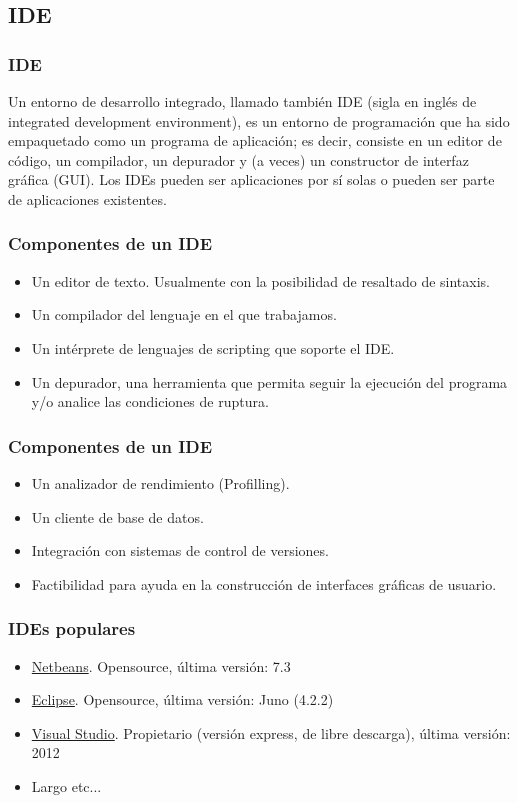 \documentclass[12pt]{beamer}
\begin{document}
\subsection{IDE}

\begin{frame}
 \frametitle{IDE}
 Un entorno de desarrollo integrado, llamado también IDE (sigla en inglés de integrated development environment), es un entorno de programación que ha sido empaquetado como un programa de aplicación; es decir, consiste en un editor de código, un compilador, un depurador y (a veces) un constructor de interfaz gráfica (GUI). Los IDEs pueden ser aplicaciones por sí solas o pueden ser parte de aplicaciones existentes. 
\end{frame}


\begin{frame}
 \frametitle{Componentes de un IDE}
 \begin{itemize}
  \item<2-> Un editor de texto. Usualmente con la posibilidad de resaltado de sintaxis.
  \item<3-> Un compilador del lenguaje en el que trabajamos.
  \item<4-> Un intérprete de lenguajes de scripting que soporte el IDE.
  \item<5-> Un depurador, una herramienta que permita seguir la ejecución del programa y/o analice las condiciones de ruptura.
  \end{itemize}
\end{frame}


\begin{frame}
 \frametitle{Componentes de un IDE}
 \begin{itemize}
  \item<2-> Un analizador de rendimiento (Profilling).
  \item<3-> Un cliente de base de datos.
  \item<4-> Integración con sistemas de control de versiones.
  \item<5-> Factibilidad para ayuda en la construcción de interfaces gráficas de usuario.
  \end{itemize}
\end{frame}


\begin{frame}
 \frametitle{IDEs populares}
 \begin{itemize}
  \item<2-> \href{http://netbeans.org/}{Netbeans}. Opensource, última versión: 7.3
  \item<3-> \href{http://www.eclipse.org/}{Eclipse}. Opensource, última versión: Juno (4.2.2)
  \item<4-> \href{http://www.microsoft.com/visualstudio/eng}{Visual Studio}. Propietario (versión express, de libre descarga), última versión: 2012
  \item<5-> Largo etc...
 \end{itemize}

\end{frame}
\end{document}
